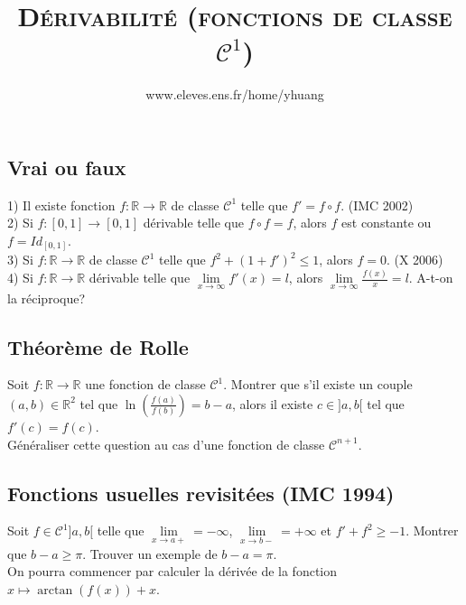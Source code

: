 \documentclass{article}
\begin{document}
\setcounter{section}{16}

\title{\textsc{D\'erivabilit\'e (fonctions de classe $\mathcal{C}^1$)}}
\author{www.eleves.ens.fr/home/yhuang}
\date{}
\maketitle

\subsection{Vrai ou faux}
1) Il existe fonction $f:\mathbb{R}\to\mathbb{R}$ de classe $\mathcal{C}^1$ telle que $f'=f\circ f$. (IMC 2002)\\
2) Si $f:[0,1]\to[0,1]$ d\'erivable telle que $f\circ f=f$, alors $f$ est constante ou $f=Id_{[0,1]}$.\\
3) Si $f:\mathbb{R}\to\mathbb{R}$ de classe $\mathcal{C}^1$ telle que $f^2+(1+f')^2\leq 1$, alors $f=0$. (X 2006)\\
4) Si $f:\mathbb{R}\to\mathbb{R}$ d\'erivable telle que $\lim\limits_{x\to\infty}f'(x)=l$, alors $\lim\limits_{x\to\infty}\frac{f(x)}{x}=l$. A-t-on la r\'eciproque?

\subsection{Th\'eor\`eme de Rolle}
Soit $f:\mathbb{R}\to\mathbb{R}$ une fonction de classe $\mathcal{C}^1$. Montrer que s'il existe un couple $(a,b)\in\mathbb{R}^2$ tel que $\ln(\frac{f(a)}{f(b)})=b-a$, alors il existe $c\in]a,b[$ tel que $f'(c)=f(c)$.\\
G\'en\'eraliser cette question au cas d'une fonction de classe $\mathcal{C}^{n+1}$.

\subsection{Fonctions usuelles revisit\'ees (IMC 1994)}
Soit $f\in\mathcal{C}^1]a,b[$ telle que $\lim\limits_{x\to a+}=-\infty$, $\lim\limits_{x\to b-}=+\infty$ et $f'+f^2\geq -1$. Montrer que $b-a\geq\pi$. Trouver un exemple de $b-a=\pi$.\\
On pourra commencer par calculer la d\'eriv\'ee de la fonction $x\mapsto \arctan(f(x))+x$.
\end{document}
